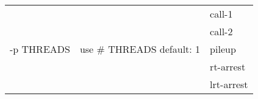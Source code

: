 {\small
\begin{tabular}{@{}p{}p{}l@{}}
\multirow{5}{=}{-p THREADS} & \multirow{5}{=}{use \# THREADS 
 default: 1} & call-1 \\
 &  & call-2 \\
 &  & pileup \\
 &  & rt-arrest \\
 &  & lrt-arrest \\
\end{tabular}\\
}
